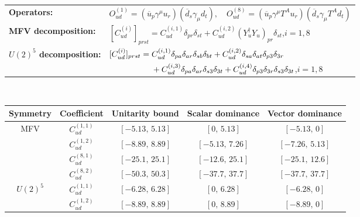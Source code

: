 \begin{table}[htbp]
\centering
{\small
\begin{tabular}{ll}
    \textbf{Operators:} &
        $\boxed{O_{ud}^{(1)} = (\overline u_p \gamma^\mu u_r)(\overline d_s \gamma_\mu d_t),\quad O_{ud}^{(8)} = (\overline u_p \gamma^\mu T^A u_r)(\overline d_s \gamma_\mu T^A d_t)}$ \\[0.2cm]
    \textbf{MFV decomposition:} &
        $[C_{ud}^{(i)}]_{prst} =
            C_{ud}^{(i,1)}\delta_{pr}\delta_{st}
            + C_{ud}^{(i,2)}(Y_u^\dagger Y_u)_{pr}\delta_{st}$,\quad $i=1,8$ \\[0.15cm]
    \textbf{$U(2)^5$ decomposition:} &
        $[C_{ud}^{(i)}]_{prst} =
            C_{ud}^{(i,1)}\Pij{p}{r}{a}\Pij{s}{t}{b}
            + C_{ud}^{(i,2)}\Pij{s}{t}{a}\delta_{p3}\delta_{3r}$ \\
        & $\phantom{[C_{ud}^{(i)}]_{prst} ={}}+ C_{ud}^{(i,3)}\Pij{p}{r}{a}\delta_{s3}\delta_{3t}
            + C_{ud}^{(i,4)}\delta_{p3}\delta_{3r}\delta_{s3}\delta_{3t}$,\quad $i=1,8$ \\
\end{tabular}
\\[0.3cm]
\renewcommand{\arraystretch}{1.3}
\begin{tabular}{ccccc}
    \toprule
    \rowcolor{hdrcolor}
    \textbf{Symmetry} & \textbf{Coefficient}
        & \textbf{Unitarity bound}
        & \textbf{Scalar dominance}
        & \textbf{Vector dominance} \\
    \midrule
    \multirow{4}{*}{MFV}
        & $C_{ud}^{(1,1)}$ & $[-5.13,\, 5.13]$  & $[0,\, 5.13]$      & $[-5.13,\, 0]$    \\
        & $C_{ud}^{(1,2)}$ & $[-8.89,\, 8.89]$  & $[-5.13,\, 7.26]$  & $[-7.26,\, 5.13]$ \\
        & $C_{ud}^{(8,1)}$ & $[-25.1,\, 25.1]$  & $[-12.6,\, 25.1]$  & $[-25.1,\, 12.6]$ \\
        & $C_{ud}^{(8,2)}$ & $[-50.3,\, 50.3]$  & $[-37.7,\, 37.7]$  & $[-37.7,\, 37.7]$ \\
    \midrule
    \multirow{8}{*}{$U(2)^5$}
        & $C_{ud}^{(1,1)}$ & $[-6.28,\, 6.28]$ & $[0,\, 6.28]$     & $[-6.28,\, 0]$    \\
        & $C_{ud}^{(1,2)}$ & $[-8.89,\, 8.89]$ & $[0,\, 8.89]$     & $[-8.89,\, 0]$    \\

\end{tabular}}
\end{table}
